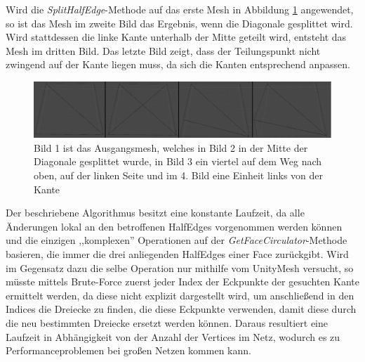 Wird die \textit{SplitHalfEdge}-Methode auf das erste Mesh in Abbildung \ref{fig:meshmash} angewendet, so ist das Mesh im zweite Bild das Ergebnis, wenn die Diagonale gesplittet wird. Wird stattdessen die linke Kante unterhalb der Mitte geteilt wird, entsteht das Mesh im dritten Bild. Das letzte Bild zeigt, dass der Teilungspunkt nicht zwingend auf der Kante liegen muss, da sich die Kanten entsprechend anpassen.
\begin{figure}[H]
	\centering
	\includegraphics[width=1 \linewidth]{Images/meshmash}
	\caption{Bild 1 ist das Ausgangsmesh, welches in Bild 2 in der Mitte der Diagonale gesplittet wurde, in Bild 3 ein viertel auf dem Weg nach oben, auf der linken Seite und im 4. Bild eine Einheit links von der Kante}
	\label{fig:meshmash}
\end{figure}

Der beschriebene Algorithmus besitzt eine konstante Laufzeit, da alle \"Anderungen lokal an den betroffenen HalfEdges vorgenommen werden k\"onnen und die einzigen ,,komplexen'' Operationen auf der \textit{GetFaceCirculator}-Methode basieren, die immer die drei anliegenden HalfEdges einer Face zur\"uckgibt. Wird im Gegensatz dazu die selbe Operation nur mithilfe vom UnityMesh versucht, so m\"usste mittels Brute-Force zuerst jeder Index der Eckpunkte der gesuchten Kante ermittelt werden, da diese nicht explizit dargestellt wird, um anschlie{\ss}end in den Indices die Dreiecke zu finden, die diese Eckpunkte verwenden, damit diese durch die neu bestimmten Dreiecke ersetzt werden k\"onnen. Daraus resultiert eine Laufzeit in Abh\"angigkeit von der Anzahl der Vertices im Netz, wodurch es zu Performanceproblemen bei gro{\ss}en Netzen kommen kann.

